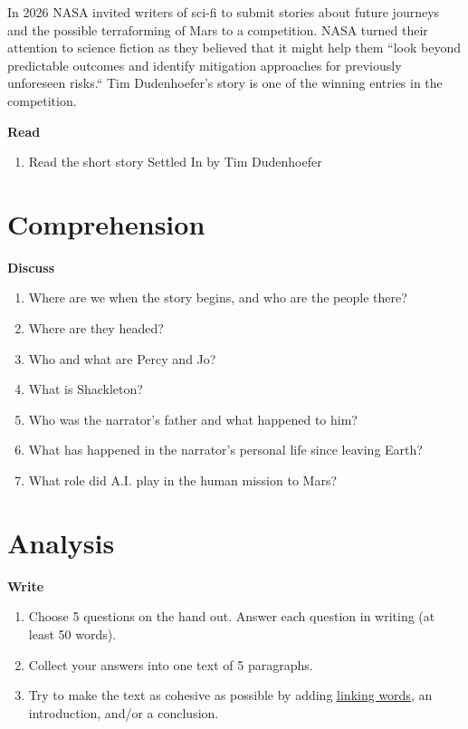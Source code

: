 \documentclass[11pt,a4paper,oneside]{book}
\newcommand{\tasktitle}[1]{{\color{blue}\bfseries #1}\par\smallskip}
\begin{document}
In 2026 NASA invited writers of sci-fi to submit stories about future journeys and the possible terraforming of Mars to a competition. NASA turned their attention to science fiction as they believed that it might help them “look beyond predictable outcomes and identify mitigation approaches for previously unforeseen risks.“ Tim Dudenhoefer’s story is one of the winning entries in the competition.

\begin{taskbox}
\tasktitle{Read}
\begin{enumerate}
\item Read the short story Settled In by Tim Dudenhoefer
\end{enumerate}
\end{taskbox}

\section*{Comprehension}
\begin{taskbox}
\tasktitle{Discuss}
\begin{enumerate}
\item Where are we when the story begins, and who are the people there?
\item Where are they headed?
\item Who and what are Percy and Jo?
\item What is Shackleton?
\item Who was the narrator’s father and what happened to him?
\item What has happened in the narrator’s personal life since leaving Earth?
\item What role did A.I. play in the human mission to Mars?
\end{enumerate}
\end{taskbox}

\section*{Analysis}
\begin{taskbox}
\tasktitle{Write}
\begin{enumerate}
\item Choose 5 questions on the hand out. Answer each question in writing (at least 50 words).
\item Collect your answers into one text of 5 paragraphs.
\item Try to make the text as cohesive as possible by adding \href{https://theenglishhandbook.systime.dk/?id=247#c1764}{linking words}, an introduction, and/or a conclusion.
\end{enumerate}
\end{taskbox}
\end{document}
